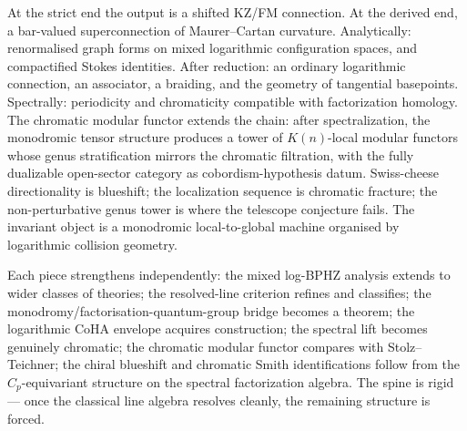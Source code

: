 At the strict end the output is a shifted KZ/FM connection. At the
derived end, a bar-valued superconnection of Maurer--Cartan curvature.
Analytically: renormalised graph forms on mixed logarithmic
configuration spaces, and compactified Stokes identities. After
reduction: an ordinary logarithmic connection, an associator, a
braiding, and the geometry of tangential basepoints. Spectrally:
periodicity and chromaticity compatible with factorization homology.
The chromatic modular functor extends the chain: after spectralization,
the monodromic tensor structure produces a tower of $K(n)$-local
modular functors whose genus stratification mirrors the chromatic
filtration, with the fully dualizable open-sector category as
cobordism-hypothesis datum. Swiss-cheese directionality is blueshift;
the localization sequence is chromatic fracture; the non-perturbative
genus tower is where the telescope conjecture fails. The invariant
object is a monodromic local-to-global machine organised by
logarithmic collision geometry.

Each piece strengthens independently: the mixed log-BPHZ analysis
extends to wider classes of theories; the resolved-line criterion
refines and classifies; the monodromy/factorisation-quantum-group
bridge becomes a theorem; the logarithmic CoHA envelope acquires
construction; the spectral lift becomes genuinely chromatic; the
chromatic modular functor compares with Stolz--Teichner; the chiral
blueshift and chromatic Smith identifications follow from the
$C_p$-equivariant structure on the spectral factorization algebra.
The spine is rigid — once the classical line algebra resolves cleanly,
the remaining structure is forced.
